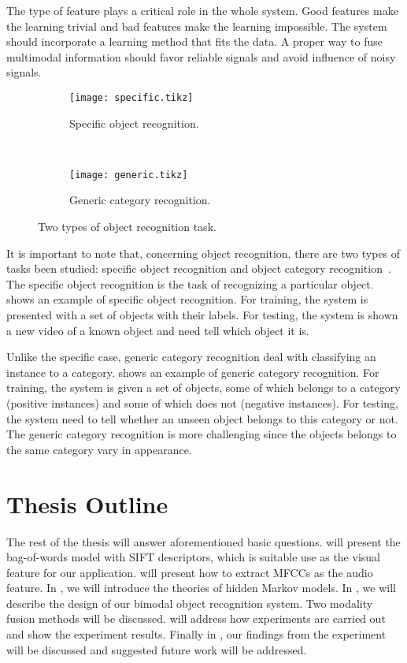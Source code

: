 \documentclass[12pt,final,twoside]{report}
\begin{document}
The type of feature plays a critical role in the whole system. Good features make the learning trivial and bad features make the learning impossible.
The system should incorporate a learning method that fits the data.
A proper way to fuse multimodal information should favor reliable signals and avoid influence of noisy signals.

\begin{figure}[t]
  \centering
  \begin{subfigure}[b]{.9\textwidth}
    \texttt{[image: specific.tikz]}
    \caption{Specific object recognition.}
    \label{fig:specific}
  \end{subfigure}

  ~

  \begin{subfigure}[b]{.9\textwidth}
    \texttt{[image: generic.tikz]}
    \caption{Generic category recognition.}
    \label{fig:generic}
  \end{subfigure}

  \caption{Two types of object recognition task.}
\end{figure}

It is important to note that, concerning object recognition, there are two types of tasks been studied: specific object recognition and object category recognition~\cite{grauman_visual_2011}. The specific object recognition is the task of recognizing a particular object.  shows an example of specific object recognition. For training, the system is presented with a set of objects with their labels. For testing, the system is shown a new video of a known object and need tell which object it is.

Unlike the specific case, generic category recognition deal with classifying an instance to a category.  shows an example of generic category recognition. For training, the system is given a set of objects, some of which belongs to a category (positive instances) and some of which does not (negative instances). For testing, the system need to tell whether an unseen object belongs to this category or not. The generic category recognition is more challenging since the objects belongs to the same category vary in appearance.

\section{Thesis Outline}
The rest of the thesis will answer aforementioned basic questions.
 will present the bag-of-words model with SIFT descriptors, which is suitable use as the visual feature for our application.
 will present how to extract MFCCs as the audio feature.  
In , we will introduce the theories of hidden Markov models.  
In , we will describe the design of our bimodal object recognition system. Two modality fusion methods will be discussed.  
 will address how experiments are carried out and show the experiment results.  
Finally in , our findings from the experiment will be discussed and suggested future work will be addressed.
\end{document}
